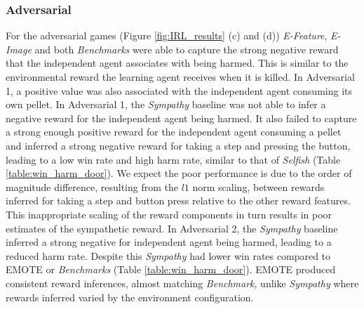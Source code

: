 \subsubsection{Adversarial}

For the adversarial games (Figure \ref{fig:IRL_results} (c) and (d)) \emph{E-Feature}, \emph{E-Image} and both \emph{Benchmarks} were able to capture the strong negative reward that the independent agent associates with being harmed. This is similar to the environmental reward the learning agent receives when it is killed. In Adversarial 1, a positive value was also associated with the independent agent consuming its own pellet. In Adversarial 1, the \emph{Sympathy} baseline was not able to infer a negative reward for the independent agent  being harmed. It also failed to capture a strong enough positive reward for the independent agent consuming a pellet and inferred a strong negative reward for taking a step and pressing the button, leading to a low win rate and high harm rate, similar to that of \emph{Selfish} (Table \ref{table:win_harm_door}). 
We expect the poor performance is due to the order of magnitude difference, resulting from the $l1$ norm scaling, between rewards inferred for taking a step and button press relative to the other reward features. This inappropriate scaling of the reward components in turn results in poor estimates of the sympathetic reward.
 In Adversarial 2, the \emph{Sympathy} baseline inferred a strong negative for independent agent being harmed, leading to a reduced harm rate. Despite this \emph{Sympathy} had lower win rates compared to EMOTE or \emph{Benchmarks} (Table \ref{table:win_harm_door}).
EMOTE produced consistent reward inferences, almost matching \emph{Benchmark}, unlike \emph{Sympathy} where rewards inferred varied by the environment configuration.
